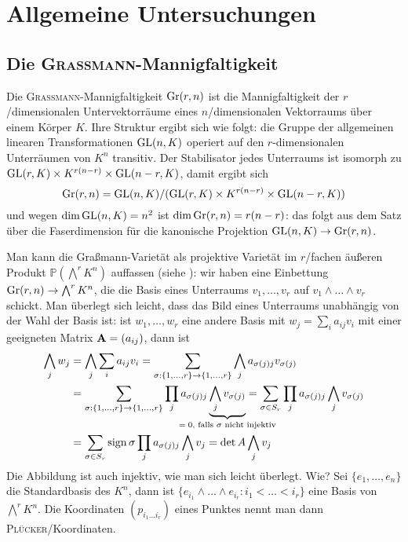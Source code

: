 \chapter{Allgemeine Untersuchungen} \label{chap:general}
\section{Die \textsc{Graßmann}-Mannigfaltigkeit} \label{sec:grassmann}
Die \textsc{Graßmann}-Mannigfaltigkeit $\grass r/n$ ist die Mannigfaltigkeit der $r$\-/dimensionalen Untervektorräume eines $n$\-/dimensionalen Vektorraums über einem Körper $K$. Ihre Struktur ergibt sich wie folgt: die Gruppe der allgemeinen linearen Transformationen $\mathrm{GL}(n,K)$ operiert auf den $r$-dimensionalen Unterräumen von $K^n$ transitiv. Der Stabilisator jedes Unterraums ist isomorph zu $\mathrm{GL}(r,K) \times K^{r(n-r)} \times \mathrm{GL}(n-r,K)$, damit ergibt sich
\begin{equation}
\grass r/n = \GL nK / (\GL rK \times K^{r(n-r)} \times \GL{n-r}K)
\end{equation}
und wegen $\dim \mathrm{GL}(n,K) = n^2$ ist $\dim \grass r/n = r(n-r)$: das folgt aus dem Satz über die Faserdimension für die kanonische Projektion $\GL nK \to \grass r/n$.

Man kann die Graßmann-Varietät als projektive Varietät im $r$\-/fachen äußeren Produkt $\mathbb P(\bigwedge^r K^n)$ auffassen (siehe \cite[S.~42]{Shafarevich}): wir haben eine Einbettung $\grass r/n \to \bigwedge^r K^n$, die die Basis eines Unterraums $v_1, \dots, v_r$ auf $v_1 \wedge
\dots \wedge v_r$ schickt. Man überlegt sich leicht, dass das Bild eines Unterraums unabhängig von der Wahl der Basis ist: ist $w_1, \dots, w_r$ eine andere Basis mit $w_j = \sum_i a_{ij} v_i$ mit einer geeigneten Matrix $\mathbf{A} = (a_{ij})$, dann ist
\begin{align*}
\bigwedge_j w_j &= \bigwedge_j \sum_i a_{ij} v_i = \sum_{\sigma: \{1,\dots,r\} \rightarrow \{1,\dots,r\}} \bigwedge_j a_{\sigma(j)j} v_{\sigma(j)} \\
	&= \sum_{\sigma: \{1,\dots,r\} \rightarrow \{1,\dots,r\}} \prod_j a_{\sigma(j)j} \wunderbrace{\bigwedge_j v_{\sigma(j)}}_{$= 0$, falls $\sigma$ nicht injektiv} = \sum_{\sigma \in S_r} \prod_j a_{\sigma(j)j} \bigwedge_j v_{\sigma(j)} \\
	&= \sum_{\sigma \in S_r} \sign \sigma \prod_j a_{\sigma(j)j} \bigwedge_j v_j = \det A \bigwedge_j v_j
\end{align*}
Die Abbildung ist auch injektiv, wie man sich leicht überlegt. \note Wie?
Sei $\{e_1, \dots, e_n\}$ die Standardbasis des $K^n$, dann ist $\{e_{i_1} \wedge \dots \wedge e_{i_r} \colon i_1 < \dots < i_r\}$ eine Basis von $\bigwedge^r K^n$. Die Koordinaten $(p_{i_1 \dots i_r})$ eines Punktes nennt man dann \textsc{Plücker}\-/Koordinaten.

